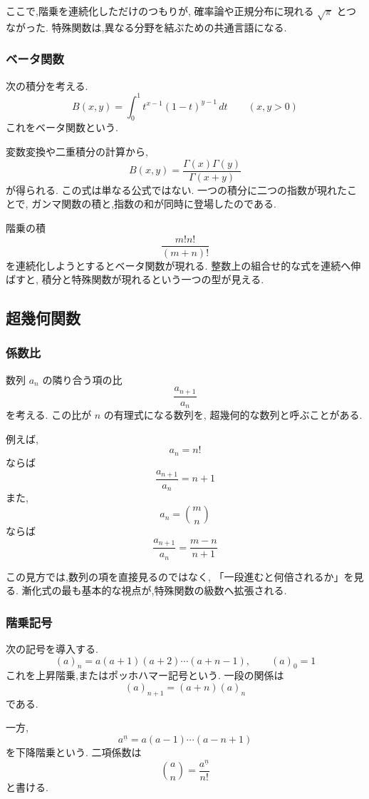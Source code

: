 ここで,階乗を連続化しただけのつもりが,
確率論や正規分布に現れる $\sqrt{\pi}$ とつながった.
特殊関数は,異なる分野を結ぶための共通言語になる.

\subsubsection{ベータ関数}

次の積分を考える.
\[
  B(x,y)=\int_0^1 t^{x-1}(1-t)^{y-1}\,dt
  \qquad (x,y>0)
\]
これをベータ関数という.

変数変換や二重積分の計算から,
\[
  B(x,y)=\frac{\Gamma(x)\Gamma(y)}{\Gamma(x+y)}
\]
が得られる.
この式は単なる公式ではない.
一つの積分に二つの指数が現れたことで,
ガンマ関数の積と,指数の和が同時に登場したのである.

階乗の積
\[
  \frac{m!n!}{(m+n)!}
\]
を連続化しようとするとベータ関数が現れる.
整数上の組合せ的な式を連続へ伸ばすと,
積分と特殊関数が現れるという一つの型が見える.

\subsection{超幾何関数}

\subsubsection{係数比}

数列 $a_n$ の隣り合う項の比
\[
  \frac{a_{n+1}}{a_n}
\]
を考える.
この比が $n$ の有理式になる数列を,
超幾何的な数列と呼ぶことがある.

例えば,
\[
  a_n=n!
\]
ならば
\[
  \frac{a_{n+1}}{a_n}=n+1
\]
また,
\[
  a_n=\binom{m}{n}
\]
ならば
\[
  \frac{a_{n+1}}{a_n}
  =\frac{m-n}{n+1}
\]

この見方では,数列の項を直接見るのではなく,
「一段進むと何倍されるか」を見る.
漸化式の最も基本的な視点が,特殊関数の級数へ拡張される.

\subsubsection{階乗記号}

次の記号を導入する.
\[
  (a)_n=a(a+1)(a+2)\cdots(a+n-1),
  \qquad (a)_0=1
\]
これを上昇階乗,またはポッホハマー記号という.
一段の関係は
\[
  (a)_{n+1}=(a+n)(a)_n
\]
である.

一方,
\[
  a^{\underline n}
  =a(a-1)\cdots(a-n+1)
\]
を下降階乗という.
二項係数は
\[
  \binom{a}{n}
  =\frac{a^{\underline n}}{n!}
\]
と書ける.

